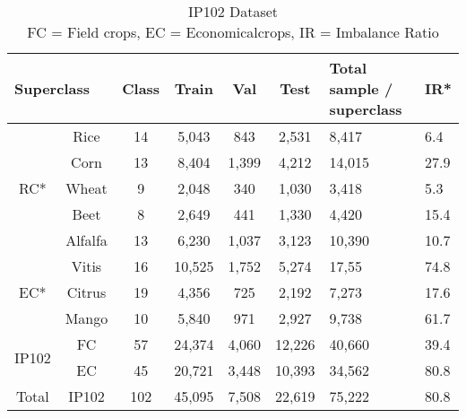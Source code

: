 \begin{center}
\centering
\begin{table}[!htbp]
\begin{tabular}{|c|c|c|c|c|c|p{3cm}|p{2cm}|}
\hline
\multicolumn{2}{|l|}{\textbf{Superclass}} & \textbf{Class} & \textbf{Train} & \textbf{Val} & \textbf{Test} & \textbf{Total sample / superclass} & \textbf{IR*}\\
\hline
\multirow{5}{3em}{RC*} & Rice & 14 & 5,043 & 843 & 2,531 & 8,417 & 6.4 \\\cline{2-8}
& Corn & 13 & 8,404 & 1,399 & 4,212 & 14,015 & 27.9 \\\cline{2-8}
& Wheat & 9 & 2,048 & 340 & 1,030 & 3,418 & 5.3 \\\cline{2-8}
& Beet & 8 & 2,649 & 441 & 1,330 & 4,420 & 15.4\\\cline{2-8}
& Alfalfa & 13 & 6,230 & 1,037 & 3,123 & 10,390 & 10.7\\\cline{2-8}
\hline
\multirow{3}{3em}{EC*} & Vitis & 16 & 10,525 & 1,752 & 5,274 & 17,55 & 74.8\\\cline{2-8}
& Citrus & 19 & 4,356 & 725 & 2,192 & 7,273 & 17.6 \\\cline{2-8}
& Mango & 10 & 5,840 & 971 & 2,927 & 9,738 & 61.7\\\cline{2-8}
\hline
\multirow{2}{3em}{IP102} & FC & 57 & 24,374 & 4,060 & 12,226 & 40,660 & 39.4\\\cline{2-8}
& EC & 45 & 20,721 & 3,448 & 10,393 & 34,562 & 80.8\\\cline{2-8}
\hline
Total & IP102 & 102 & 45,095 & 7,508 & 22,619 & 75,222 & 80.8\\\cline{2-8}
\hline
\end{tabular}
\caption{IP102 Dataset\\ FC = Field crops,    EC = Economicalcrops, IR = Imbalance Ratio}
\label{table_ip102}
\end{table}
\end{center}